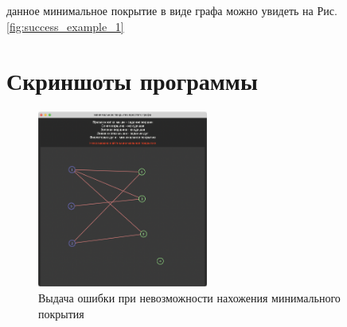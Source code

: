 \documentclass[12pt]{article}
\begin{document}
данное минимальное покрытие в виде графа можно увидеть на
Рис. \ref{fig:success_example_1}

\section{Скриншоты программы}

\begin{figure}[H]
    \centering
    \includegraphics[width=0.5\textwidth]{screenshot1.png}
    \caption{Выдача ошибки при невозможности
        нахожения минимального покрытия}
    \label{fig:failure_example}
\end{figure}
\end{document}
